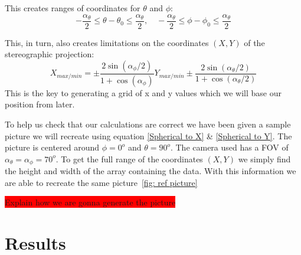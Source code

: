 \documentclass[reprint,english,notitlepage]{revtex4-2}
\begin{document}
This creates ranges of coordinates for $ θ  $ and $ ϕ $:
\begin{equation}\label{eq: limitations phi and theta}
  - \frac{\alpha _{\theta}}{2} \le θ - θ _{0} \le \frac{\alpha _{\theta }}{2}, \quad - \frac{\alpha _{\theta}}{2} \le ϕ  - ϕ _{0} \le \frac{\alpha _{\theta }}{2}
\end{equation}

This, in turn, also creates limitations on the coordinates $ (X,Y) $ of the stereographic projection: 
\begin{subequations} \label{eq: limitations X and Y lim}
	\begin{equation}
		X _{max / min} = ± \frac{2 \sin (α _{\phi} / 2)}{1 + \cos (\alpha _{\phi})}
	  \end{equation}
	  
	  
	\begin{equation}
		Y _{max / min} ± \frac{2 \sin (\alpha _{\theta}  / 2)}{1 + \cos (α _{\theta}/2)}
	\end{equation}
	
\end{subequations}
This is the key to generating a grid of x and y values which we will base our position from later. 

To help us check that our calculations are correct we have been given a sample picture we will recreate using equation \ref{Spherical to X} \& \ref{Spherical to Y}. The picture is centered around $ \phi = 0^{o} $ and $ \theta = 90^{o} $. The camera used has a FOV of $ α_{\theta} = α_{\phi} = 70^{o} $. To get the full range of the coordinates $ (X,Y) $ we simply find the height and width of the array containing the data. With this information we are able to recreate the same picture~\ref{fig: ref picture}



\colorbox{red}{Explain how we are gonna generate the picture}




\section{Results} \label{sec:results}
\end{document}
